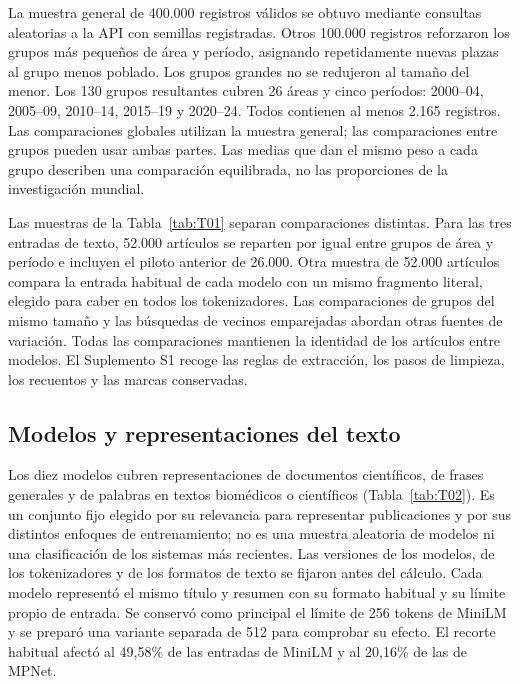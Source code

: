 \documentclass[12pt]{article}
\begin{document}
La muestra general de 400.000 registros válidos se obtuvo mediante consultas aleatorias a la API con semillas registradas. Otros 100.000 registros reforzaron los grupos más pequeños de área y período, asignando repetidamente nuevas plazas al grupo menos poblado. Los grupos grandes no se redujeron al tamaño del menor. Los 130 grupos resultantes cubren 26 áreas y cinco períodos: 2000--04, 2005--09, 2010--14, 2015--19 y 2020--24. Todos contienen al menos 2.165 registros. Las comparaciones globales utilizan la muestra general; las comparaciones entre grupos pueden usar ambas partes. Las medias que dan el mismo peso a cada grupo describen una comparación equilibrada, no las proporciones de la investigación mundial.

Las muestras de la Tabla~\ref{tab:T01} separan comparaciones distintas. Para las tres entradas de texto, 52.000 artículos se reparten por igual entre grupos de área y período e incluyen el piloto anterior de 26.000. Otra muestra de 52.000 artículos compara la entrada habitual de cada modelo con un mismo fragmento literal, elegido para caber en todos los tokenizadores. Las comparaciones de grupos del mismo tamaño y las búsquedas de vecinos emparejadas abordan otras fuentes de variación. Todas las comparaciones mantienen la identidad de los artículos entre modelos. El Suplemento S1 recoge las reglas de extracción, los pasos de limpieza, los recuentos y las marcas conservadas.


\subsection{Modelos y representaciones del texto}
Los diez modelos cubren representaciones de documentos científicos, de frases generales y de palabras en textos biomédicos o científicos (Tabla~\ref{tab:T02}). Es un conjunto fijo elegido por su relevancia para representar publicaciones y por sus distintos enfoques de entrenamiento; no es una muestra aleatoria de modelos ni una clasificación de los sistemas más recientes. Las versiones de los modelos, de los tokenizadores y de los formatos de texto se fijaron antes del cálculo. Cada modelo representó el mismo título y resumen con su formato habitual y su límite propio de entrada. Se conservó como principal el límite de 256 tokens de MiniLM y se preparó una variante separada de 512 para comprobar su efecto. El recorte habitual afectó al 49,58\% de las entradas de MiniLM y al 20,16\% de las de MPNet.
\end{document}
